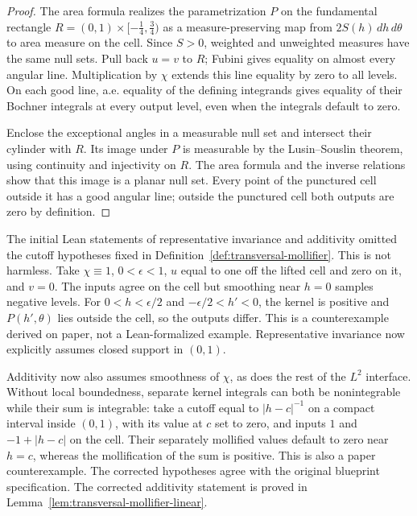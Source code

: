 \begin{proof}
\leanok
The area formula realizes the parametrization $P$ on the fundamental
rectangle $R=(0,1)\times[-\frac14,\frac34)$ as a measure-preserving map
from $2S(h)\,dh\,d\theta$ to area measure on the cell. Since $S>0$, weighted
and unweighted measures have the same null sets. Pull back $u=v$ to $R$;
Fubini gives equality on almost every angular line. Multiplication by
$\chi$ extends this line equality by zero to all levels. On each good line,
a.e. equality of the defining integrands gives equality of their Bochner
integrals at every output level, even when the integrals default to zero.

Enclose the exceptional angles in a measurable null set and intersect their
cylinder with $R$. Its image under $P$ is measurable by the Lusin--Souslin
theorem, using continuity and injectivity on $R$. The area formula and the
inverse relations show that this image is a planar null set. Every point
of the punctured cell outside it has a good angular line; outside the
punctured cell both outputs are zero by definition.
\end{proof}

\begin{remark}
The initial Lean statements of representative invariance and additivity
omitted the cutoff hypotheses fixed in Definition~\ref{def:transversal-mollifier}.
This is not harmless. Take $\chi\equiv1$, $0<\epsilon<1$, $u$ equal to one
off the lifted cell and zero on it, and $v=0$. The inputs agree on the cell
but smoothing near $h=0$ samples negative levels. For $0<h<\epsilon/2$ and $-\epsilon/2<h'<0$, the kernel is
positive and $P(h',\theta)$ lies outside the cell, so the outputs differ.
This is a counterexample derived on paper, not a Lean-formalized example.
Representative invariance now explicitly assumes closed support in $(0,1)$.

Additivity now also assumes smoothness of $\chi$, as does the rest of the
$L^2$ interface. Without local boundedness, separate kernel integrals can
both be nonintegrable while their sum is integrable: take a cutoff equal
to $|h-c|^{-1}$ on a compact interval inside $(0,1)$, with its value at $c$
set to zero, and inputs $1$ and $-1+|h-c|$ on the cell. Their separately
mollified values default to zero near $h=c$, whereas the mollification of
the sum is positive. This is also a paper counterexample. The corrected
hypotheses agree with the original blueprint specification. The corrected
additivity statement is proved in Lemma~\ref{lem:transversal-mollifier-linear}.
\end{remark}

